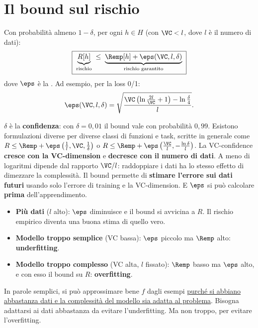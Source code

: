 \section{Il bound sul rischio}
\label{sec:vc-bound}

\begin{teorema}[VC-bound]
Con probabilità almeno $1-\delta$, per ogni $h\in H$ (con $\VC<l$, dove $l$ è il numero di dati):
\begin{equation}\label{eq:vc-bound}
\boxed{\;\underbrace{R[h]}_{\text{rischio}} \;\le\; \underbrace{\Remp[h] + \eps(\VC,l,\delta)}_{\text{rischio garantito}}\;}
\end{equation}
dove $\eps$ è la . Ad esempio, per la loss 0/1:
\[
\eps(\VC,l,\delta) = \sqrt{\frac{\VC\left(\ln\frac{2l}{\VC}+1\right) - \ln\frac{\delta}{4}}{l}} .
\]
\end{teorema}

$\delta$ è la \textbf{confidenza}: con $\delta=0{,}01$ il bound vale con probabilità $0{,}99$. Esistono
formulazioni diverse per diverse classi di funzioni e task, scritte in generale come
$R\le\Remp+\eps\left(\frac1l,\VC,\frac1\delta\right)$ o $R\le\Remp+\eps\left(\frac{\VC}{l},-\frac{\ln\delta}{l}\right)$.
La VC-confidence \textbf{cresce con la VC-dimension} e \textbf{decresce con il numero di dati}. A meno di
logaritmi dipende dal rapporto $\VC/l$: raddoppiare i dati ha lo stesso effetto di dimezzare la complessità. Il
bound permette di \textbf{stimare l'errore sui dati futuri} usando solo l'errore di training e la VC-dimension. E
$\eps$ si può calcolare \textbf{prima} dell'apprendimento.

\begin{idea}
\begin{itemize}
  \item \textbf{Più dati} ($l$ alto): $\eps$ diminuisce e il bound si avvicina a $R$. Il rischio empirico diventa
        una buona stima di quello vero.
  \item \textbf{Modello troppo semplice} (VC bassa): $\eps$ piccolo ma $\Remp$ alto: \textbf{underfitting}.
  \item \textbf{Modello troppo complesso} (VC alta, $l$ fissato): $\Remp$ basso ma $\eps$ alto, e con esso il
        bound su $R$: \textbf{overfitting}.
\end{itemize}
In parole semplici, si può approssimare bene $f$ dagli esempi \uline{purché si abbiano abbastanza dati e la
complessità del modello sia adatta al problema}. Bisogna adattarsi ai dati abbastanza da evitare l'underfitting.
Ma non troppo, per evitare l'overfitting.
\end{idea}

